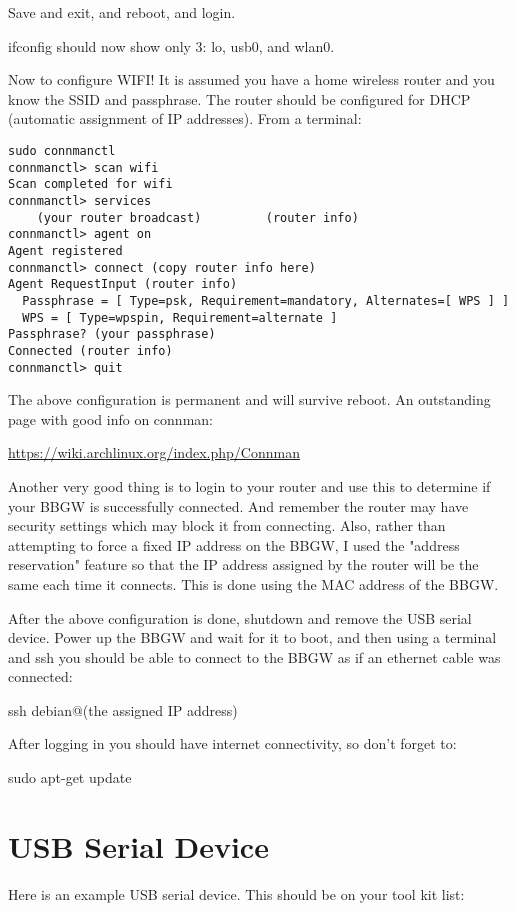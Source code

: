 Save and exit, and reboot, and login.

ifconfig should now show only 3:  lo, usb0, and wlan0.

Now to configure WIFI!  It is assumed you have a home wireless router and you 
know the SSID and passphrase.
The router should be configured for DHCP (automatic assignment of IP addresses).
From a terminal:

\begin{verbatim}
sudo connmanctl
connmanctl> scan wifi
Scan completed for wifi
connmanctl> services
    (your router broadcast)         (router info)
connmanctl> agent on
Agent registered
connmanctl> connect (copy router info here)
Agent RequestInput (router info)
  Passphrase = [ Type=psk, Requirement=mandatory, Alternates=[ WPS ] ]
  WPS = [ Type=wpspin, Requirement=alternate ]
Passphrase? (your passphrase)
Connected (router info)
connmanctl> quit
\end{verbatim}

The above configuration is permanent and will survive reboot.
An outstanding page with good info on connman:

\url{https://wiki.archlinux.org/index.php/Connman}

Another very good thing is to login to your router and use this to determine if 
your BBGW is successfully connected.
And remember the router may have security settings which may block it from 
connecting.
Also, rather than attempting to force a fixed IP address on the BBGW, I used 
the "address reservation" feature
so that the IP address assigned by the router will be the same each time it 
connects.  This is done using the MAC address of the BBGW.

After the above configuration is done, shutdown and remove the USB serial 
device.
Power up the BBGW and wait for it to boot, and then using a terminal and ssh 
you should be able to connect to the BBGW as if an ethernet cable was connected:

ssh debian@(the assigned IP address)

After logging in you should have internet connectivity, so don't forget to:

sudo apt-get update

\section{USB Serial Device}

Here is an example USB serial device.  This should be on your tool kit list:

